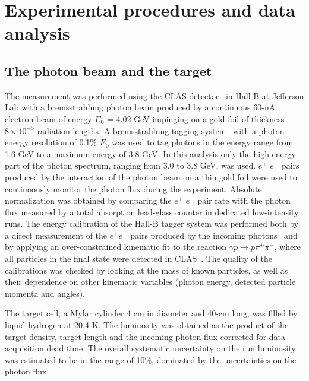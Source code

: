 \documentclass[twocolumn,superscriptaddress,prd]{revtex4}
\begin{document}
\section{\label{sec:exp} Experimental procedures and data analysis}
\subsection{The photon beam and the target}
The measurement   was performed using the CLAS detector~\cite{B00} 
in  Hall B at Jefferson Lab with a bremsstrahlung 
photon beam  produced by a continuous 60-nA electron beam of energy  $E_0$ = 4.02 GeV  
impinging on a gold foil of thickness $8 \times 10^{-5}$ radiation lengths.
A bremsstrahlung tagging system~\cite{SO99} with a photon energy resolution of 0.1$\%$ $E_0$ 
was used to tag photons in the energy range from 1.6 GeV
to a maximum energy of 3.8 GeV. In this analysis only the high-energy 
part of the photon spectrum, ranging from 3.0 to 3.8 GeV, was used.
$e^+$ $e^-$ pairs produced by the interaction of the  photon beam on a thin gold foil were used
to continuously monitor the photon flux  during the experiment. Absolute normalization was obtained by comparing 
the $e^+$ $e^-$ pair rate with the photon flux measured by a total absorption lead-glass counter in dedicated
low-intensity runs.
The  energy calibration of the Hall-B tagger system
was performed both by a direct measurement of the $e^+e^-$ pairs produced by the incoming photons~\cite{tag-abs_cal}
and by applying  an over-constrained kinematic fit  to the  reaction $\gamma p \to p \pi^+ \pi^-$, where all particles
in the final state were detected in CLAS~\cite{tag-kinefit}.
The quality of the calibrations was checked by 
looking at  the mass  of known particles, as well as their dependence on  other kinematic variables 
(photon energy, detected particle momenta and angles).

The target cell, a Mylar  cylinder  4 cm in diameter and 40-cm long, was filled by liquid hydrogen at 20.4 K.
The luminosity was obtained as the product of the target density, 
target length and the incoming photon flux 
corrected for data-acquisition dead time.
The overall   systematic uncertainty on the run  luminosity was estimated to be in the range of  10$\%$,
dominated by the uncertainties on the photon flux.
\end{document}

